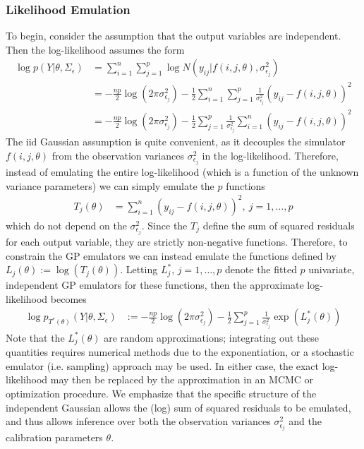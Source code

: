 \documentclass[12pt]{article}
\begin{document}
\subsubsection{Likelihood Emulation}
To begin, consider the assumption that the output variables are independent. Then the log-likelihood assumes the form
\begin{align}
\log p(Y|\theta, \Sigma_\epsilon) &= \sum_{i = 1}^{n} \sum_{j = 1}^{p} \log N(y_{ij}|f(i, j, \theta), \sigma^2_{\epsilon_j}) \\
					  	  &= -\frac{np}{2} \log(2\pi \sigma^2_{\epsilon_j})  - \frac{1}{2} \sum_{i = 1}^{n} \sum_{j = 1}^{p} \frac{1}{\sigma^2_{\epsilon_j}} (y_{ij} - f(i, j, \theta))^2 \nonumber \\
						  &= -\frac{np}{2} \log(2\pi \sigma^2_{\epsilon_j}) - \frac{1}{2} \sum_{j = 1}^{p} \frac{1}{\sigma^2_{\epsilon_j}} \sum_{i = 1}^{n} (y_{ij} - f(i, j, \theta))^2 \nonumber
\end{align}
The iid Gaussian assumption is quite convenient, as it decouples the simulator $f(i, j, \theta)$ from the observation variances $\sigma^2_{\epsilon_j}$ in the log-likelihood. 
Therefore, instead of emulating the entire log-likelihood (which is a function of the unknown variance parameters) we can simply emulate the $p$ functions
\begin{align}
T_j(\theta) &= \sum_{i = 1}^{n} (y_{ij} - f(i, j, \theta))^2, \ j = 1, \dots, p \label{SSR}
\end{align}
which do not depend on the $\sigma^2_{\epsilon_j}$. Since the $T_j$ define the sum of squared residuals for each output variable, they are strictly non-negative 
functions. Therefore, to constrain the GP emulators we can instead emulate the functions defined by $L_j(\theta) := \log(T_j(\theta))$. 
Letting $L_j^*$, $j = 1, \dots, p$ denote the fitted $p$ univariate, independent GP emulators for these functions, then the approximate log-likelihood becomes
\begin{align}
\log p_{T^*(\theta)}(Y|\theta, \Sigma_\epsilon) &:= -\frac{np}{2} \log(2\pi \sigma^2_{\epsilon_j})  - \frac{1}{2} \sum_{j = 1}^{p} \frac{1}{\sigma^2_{\epsilon_j}} \exp\left(L^*_j(\theta)\right) \label{approx_emulator_llik_indep}
\end{align}
Note that the $L^*_j(\theta)$ are random approximations; integrating out these quantities requires numerical methods due to the exponentiation, or a stochastic emulator 
(i.e. sampling) approach may be used. In either case, the exact log-likelihood may then be replaced by the approximation in an MCMC or optimization procedure. We 
emphasize that the specific structure of the independent Gaussian allows the (log) sum of squared residuals to be emulated, and thus allows inference over both the 
observation variances $\sigma^2_{\epsilon_j}$ and the calibration parameters $\theta$. 
\end{document}
